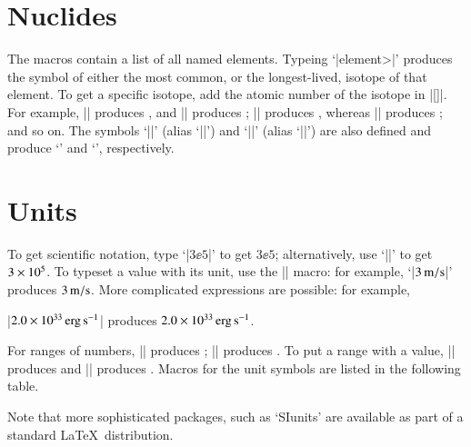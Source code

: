 \documentclass[11pt]{article}
\begin{document}
\section{Nuclides}\label{s.nuclides.tex}

The  macros contain a list of all named elements.  Typeing `|\<element>|' produces the symbol of either the most common, or the longest-lived, isotope of that element.  To get a specific isotope, add the atomic number of the isotope in |[]|.  For example, |\carbon| produces \carbon, and |\carbon[13]| produces \carbon[13]; |\cadmium| produces \cadmium, whereas |\cadmium[116]| produces \cadmium[116]; and so on.
The symbols `|\neutron|' (alias `|\nt|') and `|\proton|' (alias `|\pt|') are also defined and produce `\neutron' and `\proton', respectively.

\section{Units}

To get scientific notation, type `|$3\ee{5}$|' to get $3\ee{5}$; alternatively, use `||' to get $3\times 10^{5}$.  To typeset a value with its unit, use the |\val| macro: for example, `|$3\,\mathrm{m}/\mathrm{s}$|' produces $3\,\mathrm{m}/\mathrm{s}$.  More complicated expressions are possible: for example,
\begin{center}
|$2.0\times 10^{33}\,\mathrm{erg}\,{\mathrm{s}}^{-1}$| produces $2.0\times 10^{33}\,\mathrm{erg}\,{\mathrm{s}}^{-1}$.
\end{center}
  For ranges of numbers, || produces ; || produces . To put a range with a value, || produces  and || produces .  Macros for the unit symbols are listed in the following table.

Note that more sophisticated packages, such as `SIunits' are available as part of a standard \LaTeX\ distribution.
\end{document}
